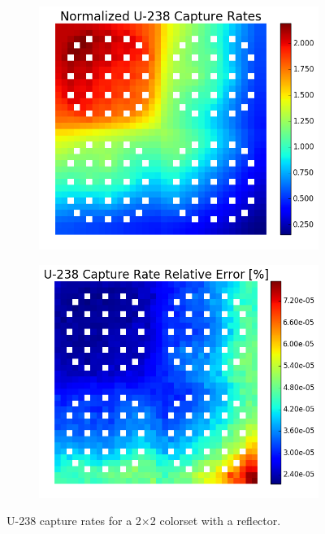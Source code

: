 \begin{figure}[h!]
\centering
\begin{subfigure}{0.5\textwidth}
  \centering
  \includegraphics[width=\linewidth]{figures/benchmarks/capture-rates/capt-mean-reflector}
  \caption{}
  \label{fig:chap7-capt-rate-mean-reflector}
\end{subfigure}%
\begin{subfigure}{0.5\textwidth}
  \centering
  \includegraphics[width=\linewidth]{figures/benchmarks/capture-rates/capt-rel-err-reflector}
  \caption{}
  \label{fig:chap7-capt-rate-rel-err-reflector}
\end{subfigure}%
\caption[U-238 capture rates for a 2$\times$2 colorset with a reflector]{U-238 capture rates for a 2$\times$2 colorset with a reflector.}
\label{fig:chap7-capt-rates-2x2}
\end{figure}

